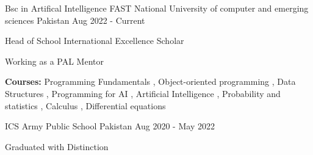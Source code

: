 

\begin{cventries}

  \cventry
    {Bsc in Artifical Intelligence} %
    {FAST National University of computer and emerging sciences} %
    {Pakistan} %
    {Aug 2022 - Current} %
    {
      \begin{cvitems} %
        \item {Head of School International Excellence Scholar}
        \item {Working as a PAL Mentor}
        \item {\textbf{Courses:} Programming Fundamentals , Object-oriented programming , Data Structures , Programming for AI , Artificial Intelligence , Probability and statistics , Calculus , Differential equations }
      \end{cvitems}
    }
    
  \cventry
    {ICS} %
    {Army Public School} %
    {Pakistan} %
    {Aug 2020 - May 2022} %
    {
      \begin{cvitems} %
        \item {Graduated with Distinction}
      \end{cvitems}
    }
    
\end{cventries}
